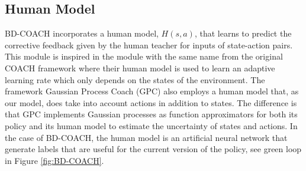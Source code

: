 






\subsection*{Human Model}



BD-COACH incorporates a human model, $H(s, a)$, that learns to predict the corrective feedback given by the human teacher for inputs of state-action pairs. This module is inspired in the module with the same name from the original COACH framework \cite{Relative-corrections-Celemin:2019} where their human model is used to learn an adaptive learning rate which only depends on the states of the environment. The framework Gaussian Process Coach (GPC) \cite{Gaussian-COACH-wout:2019} also employs a human model that, as our model, does take into account actions in addition to states. The difference is that GPC implements Gaussian processes as function approximators for both its policy and its human model to estimate the uncertainty of states and actions. In the case of BD-COACH, the human model is an artificial neural network that generate labels that are useful for the current version of the policy, see green loop in Figure \ref{fig:BD-COACH}.




